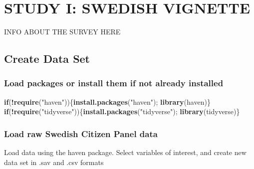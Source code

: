 \documentclass[]{book}
\newenvironment{Shaded}{\begin{snugshade}}{\end{snugshade}}
\newcommand{\KeywordTok}[1]{\textcolor[rgb]{0.13,0.29,0.53}{\textbf{#1}}}
\newcommand{\StringTok}[1]{\textcolor[rgb]{0.31,0.60,0.02}{#1}}
\newcommand{\ControlFlowTok}[1]{\textcolor[rgb]{0.13,0.29,0.53}{\textbf{#1}}}
\newcommand{\OperatorTok}[1]{\textcolor[rgb]{0.81,0.36,0.00}{\textbf{#1}}}
\newcommand{\NormalTok}[1]{#1}
\begin{document}
\part{STUDY I: SWEDISH
VIGNETTE}\label{part-study-i-swedish-vignette}

INFO ABOUT THE SURVEY HERE

\chapter{Create Data Set}\label{create-data-set}

\section{Load packages or install them if not already
installed}\label{load-packages-or-install-them-if-not-already-installed}

\begin{Shaded}
\begin{Highlighting}[]
\ControlFlowTok{if}\NormalTok{(}\OperatorTok{!}\KeywordTok{require}\NormalTok{(}\StringTok{"haven"}\NormalTok{))\{}\KeywordTok{install.packages}\NormalTok{(}\StringTok{"haven"}\NormalTok{);  }\KeywordTok{library}\NormalTok{(haven)\}}
\ControlFlowTok{if}\NormalTok{(}\OperatorTok{!}\KeywordTok{require}\NormalTok{(}\StringTok{"tidyverse"}\NormalTok{))\{}\KeywordTok{install.packages}\NormalTok{(}\StringTok{"tidyverse"}\NormalTok{);  }\KeywordTok{library}\NormalTok{(tidyverse)\}}
\end{Highlighting}
\end{Shaded}

\section{Load raw Swedish Citizen Panel
data}\label{load-raw-swedish-citizen-panel-data}

Load data using the haven package. Select variables of interest, and
create new data set in .sav and .csv formats
\end{document}

